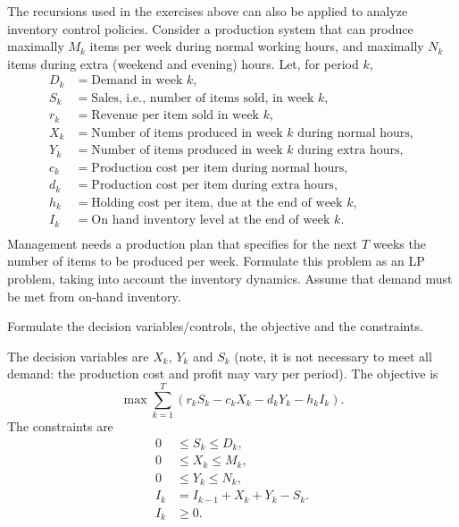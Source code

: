 \documentclass[queueing-book.tex]{subfiles}
\begin{document}
\begin{exercise}\label{ex:l-183}
The recursions used in the
 exercises above can also be applied to analyze inventory control
 policies. Consider a production system that can produce maximally
 $M_k$ items per week during normal working hours, and maximally
 $N_k$ items during extra (weekend and evening) hours. Let, for
 period $k$,
 \begin{align*}
 D_k &= \text{Demand in week $k$}, \\
 S_k &= \text{Sales, i.e., number of items sold, in week $k$}, \\
 r_k &= \text{Revenue per item sold in week $k$}, \\
 X_k &= \text{Number of items produced in week $k$ during normal hours}, \\
 Y_k &= \text{Number of items produced in week $k$ during extra hours}, \\
 c_k &= \text{Production cost per item during normal hours}, \\
 d_k &= \text{Production cost per item during extra hours}, \\
 h_k &= \text{Holding cost per item, due at the end of week $k$}, \\
 I_k &= \text{On hand inventory level at the end of week $k$}. \\
 \end{align*}
 Management needs a production plan that specifies for the next $T$ weeks the number of items to be produced per week.
 Formulate this problem as an LP problem, taking into account the inventory dynamics.
 Assume that demand must be met from on-hand inventory.
\begin{hint}
Formulate the decision variables/controls, the
 objective and the constraints.
\end{hint}
\begin{solution}
 The decision variables are $X_k$, $Y_k$ and $S_k$ (note, it is not
 necessary to meet all demand: the production cost and profit
 may vary per period). The objective is
 \begin{equation*}
 \max \sum_{k=1}^T (r_kS_k -c_k X_k - d_k Y_k - h_k I_k).
 \end{equation*}
The constraints are
\begin{align*}
 0&\leq S_k \leq D_k, \\
 0&\leq X_k \leq M_k, \\
 0&\leq Y_k \leq N_k, \\
 I_k&=I_{k-1}+X_k+Y_k - S_k. \\
I_k &\geq 0.
\end{align*}
\end{solution}
\end{exercise}



\end{document}
